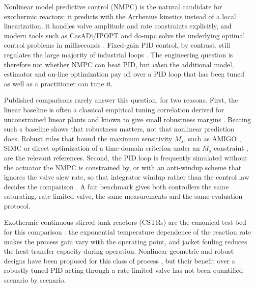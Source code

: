 
Nonlinear model predictive control (NMPC) is the natural candidate for exothermic reactors: it predicts with the Arrhenius kinetics instead of a local linearization, it handles valve amplitude and rate constraints explicitly, and modern tools such as CasADi/IPOPT and do-mpc solve the underlying optimal control problems in milliseconds \cite{rawlings2020model, hedengren2014nonlinear, fiedler2023dompc}. Fixed-gain PID control, by contrast, still regulates the large majority of industrial loops \cite{astrom2006pid, seborg2010process}. The engineering question is therefore not whether NMPC can beat PID, but \emph{when} the additional model, estimator and on-line optimization pay off over a PID loop that has been tuned as well as a practitioner can tune it.

Published comparisons rarely answer this question, for two reasons. First, the linear baseline is often a classical empirical tuning correlation derived for unconstrained linear plants and known to give small robustness margins \cite{odwyer2009handbook, garpinger2014performance}. Beating such a baseline shows that robustness matters, not that nonlinear prediction does. Robust rules that bound the maximum sensitivity $M_s$, such as AMIGO \cite{astrom2006pid}, SIMC \cite{skogestad2003simple, grimholt2018optimal} or direct optimization of a time-domain criterion under an $M_s$ constraint \cite{garpinger2014performance, padula2012optimal}, are the relevant references. Second, the PID loop is frequently simulated without the actuator the NMPC is constrained by, or with an anti-windup scheme that ignores the valve slew rate, so that integrator windup rather than the control law decides the comparison \cite{hippe2006windup, tarbouriech2009antiwindup, bohn1995analysis, peng1996nonlinear}. A fair benchmark gives both controllers the same saturating, rate-limited valve, the same measurements and the same evaluation protocol.

Exothermic continuous stirred tank reactors (CSTRs) are the canonical test bed for this comparison \cite{uppal1974dynamic, aris1958analysis, luyben2007chemical, bequette2003process}: the exponential temperature dependence of the reaction rate makes the process gain vary with the operating point, and jacket fouling reduces the heat-transfer capacity during operation. Nonlinear geometric and robust designs have been proposed for this class of process \cite{alvarez1995robust}, but their benefit over a robustly tuned PID acting through a rate-limited valve has not been quantified scenario by scenario.

